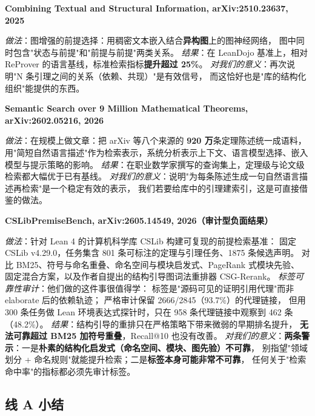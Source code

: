 \documentclass[UTF8,a4paper,11pt,fontset=windows]{ctexart}
\newcommand{\paper}[1]{\par\medskip\noindent\textbf{\color{sgblue!80!black}#1}\par\nobreak\vspace{1pt}}
\newcommand{\field}[1]{\textit{#1}：}
\begin{document}
\paper{Combining Textual and Structural Information, arXiv:2510.23637, 2025}
\field{做法}图增强的前提选择：用稠密文本嵌入结合\textbf{异构图}上的图神经网络，
图中同时包含"状态与前提"和"前提与前提"两类关系。
\field{结果}在 LeanDojo 基准上，相对 ReProver 的语言基线，标准检索指标\textbf{提升超过 25\%}。
\field{对我们的意义}再次说明"N 条引理之间的关系（依赖、共现）"是有效信号，
而这恰好也是"库的结构化组织"能提供的东西。

\paper{Semantic Search over 9 Million Mathematical Theorems, arXiv:2602.05216, 2026}
\field{做法}在规模上做文章：把 arXiv 等八个来源的 \textbf{920 万}条定理陈述统一成语料，
用"简短自然语言描述"作为检索表示，系统分析表示上下文、语言模型选择、嵌入模型与提示策略的影响。
\field{结果}在职业数学家撰写的查询集上，定理级与论文级检索都大幅优于已有基线。
\field{对我们的意义}说明"为每条陈述生成一句自然语言描述再检索"是一个稳定有效的表示，
我们若要给库中的引理建索引，这是可直接借鉴的做法。

\paper{CSLibPremiseBench, arXiv:2605.14549, 2026（审计型负面结果）}
\field{做法}针对 Lean 4 的计算机科学库 CSLib 构建可复现的前提检索基准：
固定 CSLib v4.29.0，任务集含 801 条可标注的定理与引理任务、1875 条候选声明。
对比 BM25、符号与命名重叠、命名空间与模块启发式、PageRank 式模块先验、
固定混合方案，以及作者自提出的结构引导图词法重排器 CSG-Rerank。
\field{标签可靠性审计}他们做的这件事很值得学：
标签是"源码可见的证明引用代理"而非 elaborate 后的依赖轨迹；
严格审计保留 2666/2845（93.7\%）的代理链接，
但用 300 条任务做 Lean 环境表达式探针时，只在 958 条代理链接中观察到 462 条（48.2\%）。
\field{结果}结构引导的重排只在严格策略下带来微弱的早期排名提升，
\textbf{无法可靠超过 BM25 加符号重叠}，Recall@10 也没有改善。
\field{对我们的意义}\textbf{两条警示}：一是\textbf{朴素的结构化启发式（命名空间、模块、图先验）不可靠}，
别指望"领域划分 + 命名规则"就能提升检索；二是\textbf{标签本身可能非常不可靠}，
任何关于"检索命中率"的指标都必须先审计标签。

\subsection{线 A 小结}
\end{document}
